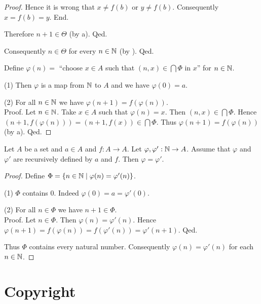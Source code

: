 \documentclass{article}
\begin{document}
\begin{forthel}
\begin{proof}
            Hence it is wrong that $x \neq f(b)$ or $y \neq f(b)$.
            Consequently $x = f(b) = y$.
          End.

          Therefore $n + 1 \in \Theta$ (by a).
        Qed.

        Consequently $n \in \Theta$ for every $n \in \mathbb{N}$ (by ).
      Qed.

      Define $\varphi(n) =$ ``choose $x \in A$ such that $(n, x) \in
      \bigcap \Phi$ in $x$'' for $n \in \mathbb{N}$.

      (1) Then $\varphi$ is a map from $\mathbb{N}$ to $A$ and we have
      $\varphi(0) = a$.

      (2) For all $n \in \mathbb{N}$ we have $\varphi(n + 1) =
      f(\varphi(n))$. \\
      Proof.
        Let $n \in \mathbb{N}$.
        Take $x \in A$ such that $\varphi(n) = x$.
        Then $(n, x) \in \bigcap \Phi$.
        Hence $(n + 1, f(\varphi(n))) = (n + 1, f(x)) \in \bigcap \Phi$.
        Thus $\varphi(n + 1) = f(\varphi(n))$ (by a).
      Qed.
    \end{proof}
  \end{forthel}

  \begin{forthel}
    \begin{theorem*}\label{dedekind_uniqueness}
      Let $A$ be a set and $a \in A$ and $f : A \to A$.
      Let $\varphi, \varphi' : \mathbb{N} \to A$.
      Assume that $\varphi$ and $\varphi'$ are recursively defined by $a$ and
      $f$.
      Then $\varphi = \varphi'$.
    \end{theorem*}
    \begin{proof}
      Define $\Phi = \{ n \in \mathbb{N} \mid \varphi(n) = \varphi'(n) \}$.

      (1) $\Phi$ contains $0$.
      Indeed $\varphi(0) = a = \varphi'(0)$.

      (2) For all $n \in \Phi$ we have $n + 1 \in \Phi$. \\
      Proof.
        Let $n \in \Phi$.
        Then $\varphi(n) = \varphi'(n)$.
        Hence $\varphi(n + 1)
          = f(\varphi(n))
          = f(\varphi'(n))
          = \varphi'(n + 1)$.
      Qed.

      Thus $\Phi$ contains every natural number.
      Consequently $\varphi(n) = \varphi'(n)$ for each $n \in \mathbb{N}$.
    \end{proof}
  \end{forthel}

  \printbibliography

  \section*{Copyright}
  \doclicenseThis
\end{document}
